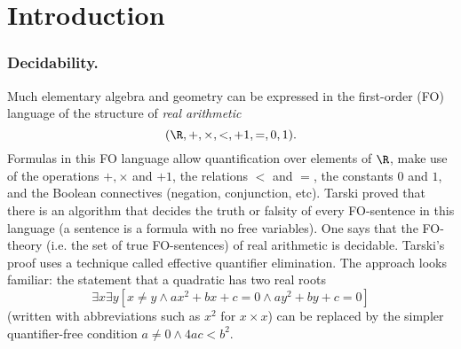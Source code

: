 










\section{Introduction} \label{AS:sec:introduction}

\subsubsection*{Decidability.}
Much elementary algebra and geometry can be
expressed in the first-order (FO) language of the structure of {\em real arithmetic}
\[(\R,+,\times,<,+1,=,0,1).\]
Formulas in this FO language allow quantification over elements of $\R$, 
make use of the operations $+, \times$ and $+1$, the relations $<$ and $=$, the constants $0$ and $1$,
and the Boolean connectives (negation, conjunction, etc).
Tarski proved that there is an algorithm that decides the truth or falsity of
every FO-sentence in this language (a sentence is a formula with no free variables). One says that the FO-theory (i.e. the set of true FO-sentences) of real arithmetic
is decidable. Tarski's proof uses a
technique called effective quantifier elimination. The approach looks familiar:
the statement that a quadratic has two real roots
\[
\exists x \exists y [x \neq y \wedge ax^2 + bx + c = 0 \wedge ay^2 + by + c =0]
\]
(written with abbreviations such as $x^2$ for $x \times x$) 
can be replaced by the simpler quantifier-free condition
$a \neq 0 \wedge 4ac < b^2.$ 

